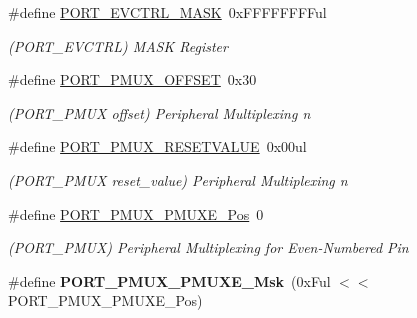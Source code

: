 \begin{DoxyCompactItemize}
\item 
\hypertarget{group___s_a_m_l21___p_o_r_t_gacff97e1262ff21624f76c9169653e4a4}{}\#define \hyperlink{group___s_a_m_l21___p_o_r_t_gacff97e1262ff21624f76c9169653e4a4}{P\+O\+R\+T\+\_\+\+E\+V\+C\+T\+R\+L\+\_\+\+M\+A\+S\+K}~0x\+F\+F\+F\+F\+F\+F\+F\+Ful\label{group___s_a_m_l21___p_o_r_t_gacff97e1262ff21624f76c9169653e4a4}

\begin{DoxyCompactList}\small\item\em (P\+O\+R\+T\+\_\+\+E\+V\+C\+T\+R\+L) M\+A\+S\+K Register \end{DoxyCompactList}\item 
\hypertarget{group___s_a_m_l21___p_o_r_t_ga2b2cfb87664f62a60eb5f01a7fbf4e9a}{}\#define \hyperlink{group___s_a_m_l21___p_o_r_t_ga2b2cfb87664f62a60eb5f01a7fbf4e9a}{P\+O\+R\+T\+\_\+\+P\+M\+U\+X\+\_\+\+O\+F\+F\+S\+E\+T}~0x30\label{group___s_a_m_l21___p_o_r_t_ga2b2cfb87664f62a60eb5f01a7fbf4e9a}

\begin{DoxyCompactList}\small\item\em (P\+O\+R\+T\+\_\+\+P\+M\+U\+X offset) Peripheral Multiplexing n \end{DoxyCompactList}\item 
\hypertarget{group___s_a_m_l21___p_o_r_t_ga4a150e2f7e2344a8a2f7e3d08ef6c39f}{}\#define \hyperlink{group___s_a_m_l21___p_o_r_t_ga4a150e2f7e2344a8a2f7e3d08ef6c39f}{P\+O\+R\+T\+\_\+\+P\+M\+U\+X\+\_\+\+R\+E\+S\+E\+T\+V\+A\+L\+U\+E}~0x00ul\label{group___s_a_m_l21___p_o_r_t_ga4a150e2f7e2344a8a2f7e3d08ef6c39f}

\begin{DoxyCompactList}\small\item\em (P\+O\+R\+T\+\_\+\+P\+M\+U\+X reset\+\_\+value) Peripheral Multiplexing n \end{DoxyCompactList}\item 
\hypertarget{group___s_a_m_l21___p_o_r_t_ga38a4c4871ecabeb4ad36398b73685bac}{}\#define \hyperlink{group___s_a_m_l21___p_o_r_t_ga38a4c4871ecabeb4ad36398b73685bac}{P\+O\+R\+T\+\_\+\+P\+M\+U\+X\+\_\+\+P\+M\+U\+X\+E\+\_\+\+Pos}~0\label{group___s_a_m_l21___p_o_r_t_ga38a4c4871ecabeb4ad36398b73685bac}

\begin{DoxyCompactList}\small\item\em (P\+O\+R\+T\+\_\+\+P\+M\+U\+X) Peripheral Multiplexing for Even-\/\+Numbered Pin \end{DoxyCompactList}\item 
\hypertarget{group___s_a_m_l21___p_o_r_t_gae955cb77e730b16d702cd0fcdb156ec4}{}\#define {\bfseries P\+O\+R\+T\+\_\+\+P\+M\+U\+X\+\_\+\+P\+M\+U\+X\+E\+\_\+\+Msk}~(0x\+Ful $<$$<$ P\+O\+R\+T\+\_\+\+P\+M\+U\+X\+\_\+\+P\+M\+U\+X\+E\+\_\+\+Pos)\label{group___s_a_m_l21___p_o_r_t_gae955cb77e730b16d702cd0fcdb156ec4}


\end{DoxyCompactItemize}
